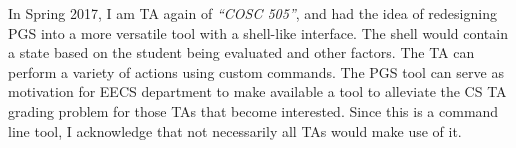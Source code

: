 \tab In Spring 2017, I am TA again of \textit{``COSC 505''}, and had the idea of
redesigning PGS into a more versatile tool with a shell-like interface.
The shell would contain a state based on the student being evaluated and other factors.
The TA can perform a variety of actions using custom commands.
The PGS tool can serve as motivation for EECS department to make available 
a tool to alleviate the CS TA grading problem for those TAs that become interested.
Since this is a command line tool, I acknowledge that not necessarily
all TAs would make use of it.

